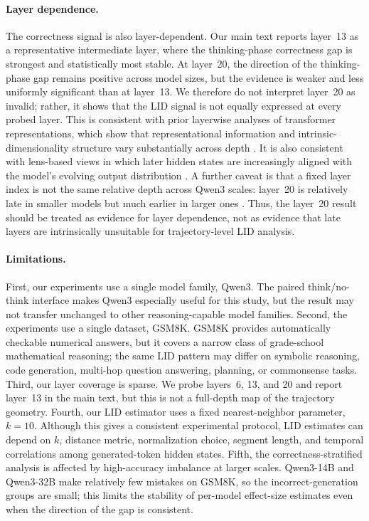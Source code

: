 \documentclass{article}
\theoremstyle{plain}
\theoremstyle{definition}
\theoremstyle{remark}
\begin{document}
\paragraph{Layer dependence.}
The correctness signal is also layer-dependent. Our main text reports layer~13 as a representative intermediate layer, where the thinking-phase correctness gap is strongest and statistically most stable. At layer~20, the direction of the thinking-phase gap remains positive across model sizes, but the evidence is weaker and less uniformly significant than at layer~13. We therefore do not interpret layer~20 as invalid; rather, it shows that the LID signal is not equally expressed at every probed layer. This is consistent with prior layerwise analyses of transformer representations, which show that representational information and intrinsic-dimensionality structure vary substantially across depth \citep{van_Aken_2019,valeriani2023geometryhiddenrepresentationslarge,rogers2020primer}. It is also consistent with lens-based views in which later hidden states are increasingly aligned with the model's evolving output distribution \citep{belrose2023eliciting}. A further caveat is that a fixed layer index is not the same relative depth across Qwen3 scales: layer~20 is relatively late in smaller models but much earlier in larger ones \citep{yang2025qwen3}. Thus, the layer~20 result should be treated as evidence for layer dependence, not as evidence that late layers are intrinsically unsuitable for trajectory-level LID analysis.

\paragraph{Limitations.}
First, our experiments use a single model family, Qwen3. The paired think/no-think interface makes Qwen3 especially useful for this study, but the result may not transfer unchanged to other reasoning-capable model families. Second, the experiments use a single dataset, GSM8K. GSM8K provides automatically checkable numerical answers, but it covers a narrow class of grade-school mathematical reasoning; the same LID pattern may differ on symbolic reasoning, code generation, multi-hop question answering, planning, or commonsense tasks. Third, our layer coverage is sparse. We probe layers~6, 13, and 20 and report layer~13 in the main text, but this is not a full-depth map of the trajectory geometry. Fourth, our LID estimator uses a fixed nearest-neighbor parameter, $k=10$. Although this gives a consistent experimental protocol, LID estimates can depend on $k$, distance metric, normalization choice, segment length, and temporal correlations among generated-token hidden states. Fifth, the correctness-stratified analysis is affected by high-accuracy imbalance at larger scales. Qwen3-14B and Qwen3-32B make relatively few mistakes on GSM8K, so the incorrect-generation groups are small; this limits the stability of per-model effect-size estimates even when the direction of the gap is consistent.
\end{document}
